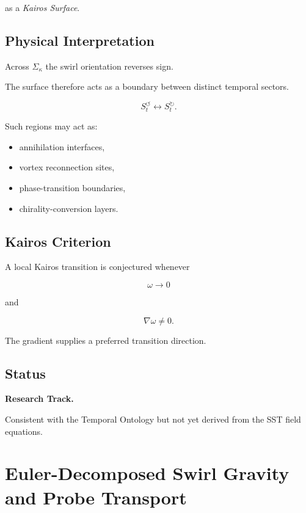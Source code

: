        as a \emph{Kairos Surface}.
    
    \subsection{Physical Interpretation}
        
        Across $\Sigma_\kappa$ the swirl orientation reverses sign.
        
        The surface therefore acts as a boundary between distinct temporal sectors.
        
        \[
            S_t^{\circlearrowleft}
            \longleftrightarrow
            S_t^{\circlearrowright}.
        \]
        
        Such regions may act as:
        
        \begin{itemize}
            \item annihilation interfaces,
            \item vortex reconnection sites,
            \item phase-transition boundaries,
            \item chirality-conversion layers.
        \end{itemize}
    
    \subsection{Kairos Criterion}
        
        A local Kairos transition is conjectured whenever
        
        \[
            \omega
            \rightarrow
            0
        \]
        
        and
        
        \[
            \nabla\omega
            \neq
            0.
        \]
        
        The gradient supplies a preferred transition direction.
    
    \subsection{Status}
        
        \textbf{Research Track.}
        
        Consistent with the Temporal Ontology but not yet derived from the SST field
        equations.

\section{Euler-Decomposed Swirl Gravity and Probe Transport}
\label{sec:appendix_euler_probe_transport}

